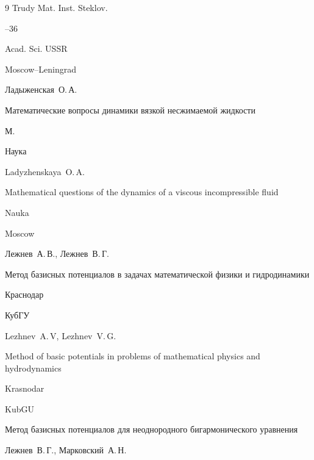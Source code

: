 \begin{thebibliography}{9}
\serial Trudy Mat. Inst. Steklov.



--36

\publ Acad. Sci. USSR

\publaddr Moscow--Leningrad




\by Ладыженская~О.\,А.

\book Математические вопросы динамики вязкой несжимаемой жидкости

\publaddr М.

\publ Наука



\misctransl

\by Ladyzhenskaya~O.\,A.

\book Mathematical questions of the dynamics of a viscous incompressible fluid 

\publ Nauka

\publaddr Moscow 






\by Лежнев~А.\,В., Лежнев~В.\,Г.

\book Метод базисных потенциалов в задачах математической физики и гидродинамики

\publaddr Краснодар

\publ КубГУ



\misctransl

\by Lezhnev~A.\,V, Lezhnev~V.\,G.

\book Method of basic potentials in problems of mathematical physics and hydrodynamics

\publaddr Krasnodar

\publ KubGU






\paper Метод базисных потенциалов для неоднородного бигармонического уравнения

\by Лежнев~В.\,Г., Марковский~А.\,Н.


\end{thebibliography}
